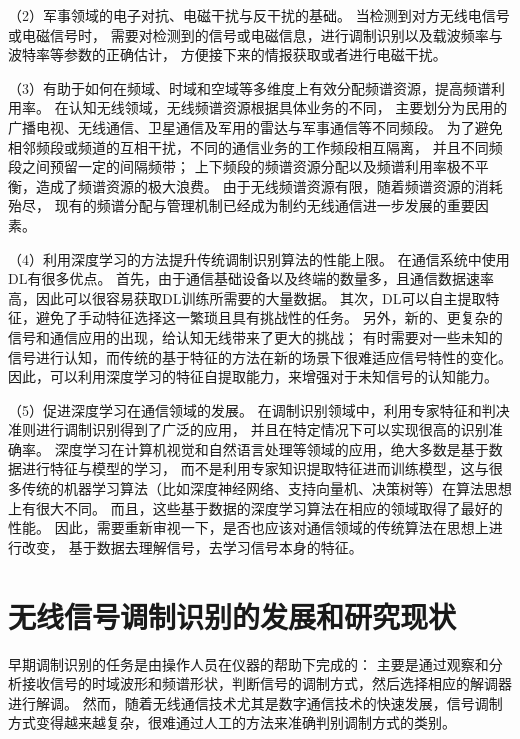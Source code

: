 （2）军事领域的电子对抗、电磁干扰与反干扰的基础。
当检测到对方无线电信号或电磁信号时，
需要对检测到的信号或电磁信息，进行调制识别以及载波频率与波特率等参数的正确估计，
方便接下来的情报获取或者进行电磁干扰。\par

（3）有助于如何在频域、时域和空域等多维度上有效分配频谱资源，提高频谱利用率。
在认知无线领域，无线频谱资源根据具体业务的不同，
主要划分为民用的广播电视、无线通信、卫星通信及军用的雷达与军事通信等不同频段。
为了避免相邻频段或频道的互相干扰，不同的通信业务的工作频段相互隔离，
并且不同频段之间预留一定的间隔频带；
上下频段的频谱资源分配以及频谱利用率极不平衡，造成了频谱资源的极大浪费。
由于无线频谱资源有限，随着频谱资源的消耗殆尽，
现有的频谱分配与管理机制已经成为制约无线通信进一步发展的重要因素。\par

（4）利用深度学习的方法提升传统调制识别算法的性能上限。
在通信系统中使用DL有很多优点。 首先，由于通信基础设备以及终端的数量多，且通信数据速率高，因此可以很容易获取DL训练所需要的大量数据。
其次，DL可以自主提取特征，避免了手动特征选择这一繁琐且具有挑战性的任务。
另外，新的、更复杂的信号和通信应用的出现，给认知无线带来了更大的挑战；
有时需要对一些未知的信号进行认知，而传统的基于特征的方法在新的场景下很难适应信号特性的变化。
因此，可以利用深度学习的特征自提取能力，来增强对于未知信号的认知能力。\par

（5）促进深度学习在通信领域的发展。
在调制识别领域中，利用专家特征和判决准则进行调制识别得到了广泛的应用，
并且在特定情况下可以实现很高的识别准确率。
深度学习在计算机视觉和自然语言处理等领域的应用，绝大多数是基于数据进行特征与模型的学习，
而不是利用专家知识提取特征进而训练模型，这与很多传统的机器学习算法（比如深度神经网络、支持向量机、决策树等）在算法思想上有很大不同。
而且，这些基于数据的深度学习算法在相应的领域取得了最好的性能。
因此，需要重新审视一下，是否也应该对通信领域的传统算法在思想上进行改变，
基于数据去理解信号，去学习信号本身的特征。\par

\section{无线信号调制识别的发展和研究现状}

早期调制识别的任务是由操作人员在仪器的帮助下完成的：
主要是通过观察和分析接收信号的时域波形和频谱形状，判断信号的调制方式，然后选择相应的解调器进行解调。
然而，随着无线通信技术尤其是数字通信技术的快速发展，信号调制方式变得越来越复杂，很难通过人工的方法来准确判别调制方式的类别。 \par

